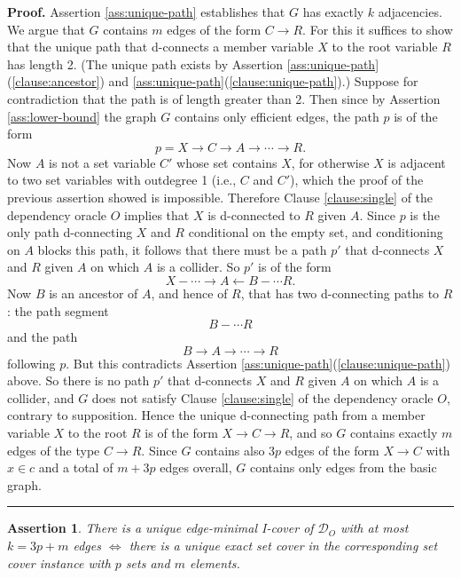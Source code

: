 \documentclass{elsarticle}%
\newtheorem{assertion}[theorem]{Assertion}
\renewenvironment{proof}[1][Proof]{\noindent\textbf{#1.} }{\ \rule{0.5em}{0.5em}}
\newcommand{\A}{A}
\newcommand{\B}{B}
\newcommand{\R}{R}
\newcommand{\X}{X}
\newcommand{\C}{C}
\newcommand{\G}{G}
\newcommand{\D}{\mathcal{D}}
\renewcommand{\c}{c}
\newcommand{\x}{x}
\begin{document}
\begin{proof}
Assertion \ref{ass:unique-path} establishes that $\G$ has exactly $k$ adjacencies. We argue that $\G$ contains $m$ edges of the form $\C \rightarrow \R$. For this it suffices to show that the unique path that d-connects a member variable $\X$ to the root variable $\R$ has length 2. (The unique path exists by Assertion \ref{ass:unique-path}(\ref{clause:ancestor}) and \ref{ass:unique-path}(\ref{clause:unique-path}).)
Suppose for contradiction that the path is of length greater than 2. Then since by Assertion \ref{ass:lower-bound} the  graph $G$ contains only efficient edges, the path $p$ is of the form $$p= \X \rightarrow \C \rightarrow \A \rightarrow \cdots \rightarrow \R.$$ Now $\A$ is not a set variable $\C'$ whose set contains $\X$, for otherwise $\X$ is adjacent to two set variables with outdegree 1 (i.e., $\C$ and $\C'$), which the proof of the previous assertion showed is impossible. Therefore Clause \ref{clause:single} of the dependency oracle $O$ implies that $\X$ is d-connected to $\R$ given $\A$. Since $p$ is the only path d-connecting $\X$ and $\R$ conditional on the empty set, and conditioning on $\A$ blocks this path, it follows that there must be a path $p'$ that d-connects $\X$ and $\R$ given $\A$ on which $\A$ is a collider. So $p'$ is of the form $$\X - \cdots \rightarrow \A \leftarrow \B - \cdots \R.$$ Now $\B$ is an ancestor of $\A$, and hence of $\R$, that has two d-connecting paths to $\R$: the path segment $$\B - \cdots \R$$ and the path $$\B \rightarrow \A \rightarrow \cdots \rightarrow \R$$ following $p$. But this contradicts Assertion \ref{ass:unique-path}(\ref{clause:unique-path}) above. So there is no path $p'$ that d-connects $\X$ and $\R$ given $\A$ on which $\A$ is a collider, and $\G$ does not satisfy Clause \ref{clause:single} of the dependency oracle $O$, contrary to supposition. Hence the unique d-connecting path from a member variable $\X$ to the root $\R$ is of the form $\X \rightarrow \C \rightarrow \R$, and so $\G$ contains exactly  $m$ edges of the type $\C \rightarrow \R$. Since $\G$ contains also $3p$ edges of the form $\X \rightarrow \C$ with $\x \in \c$ and a total of $m + 3p$ edges overall, $\G$ contains only edges from the basic graph.
\end{proof}
  

\begin{assertion} There is a unique edge-minimal I-cover of
$\D_{O}$ with at most $k = 3p+m$ edges $\iff$ there is a unique exact set cover in the
corresponding set cover instance with $p$ sets and $m$ elements. 
\end{assertion}
\end{document}
